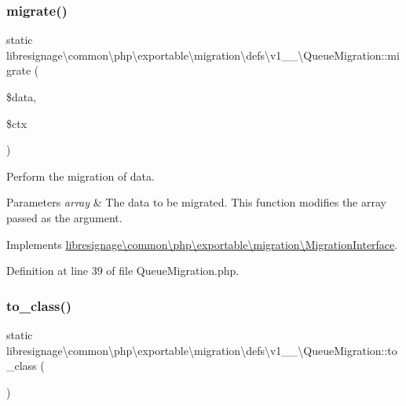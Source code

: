 \subsubsection{\texorpdfstring{migrate()}{migrate()}}
{\footnotesize\ttfamily static libresignage\textbackslash{}common\textbackslash{}php\textbackslash{}exportable\textbackslash{}migration\textbackslash{}defs\textbackslash{}v1\+\_\+\_\textbackslash{}\+Queue\+Migration\+::migrate (\begin{DoxyParamCaption}\item[{array \&}]{\$data,  }\item[{\hyperlink{classlibresignage_1_1common_1_1php_1_1exportable_1_1ExportableDataContext}{Exportable\+Data\+Context}}]{\$ctx }\end{DoxyParamCaption})\hspace{0.3cm}{\ttfamily [static]}}

Perform the migration of data.


\begin{DoxyParams}{Parameters}
{\em array} & The data to be migrated. This function modifies the array passed as the argument. \\
\hline
\end{DoxyParams}


Implements \hyperlink{interfacelibresignage_1_1common_1_1php_1_1exportable_1_1migration_1_1MigrationInterface_a8275bfe14f59f19bb3b33b239fd48c5d}{libresignage\textbackslash{}common\textbackslash{}php\textbackslash{}exportable\textbackslash{}migration\textbackslash{}\+Migration\+Interface}.



Definition at line 39 of file Queue\+Migration.\+php.

\mbox{\label{classlibresignage_1_1common_1_1php_1_1exportable_1_1migration_1_1defs_1_1v1__0__0_1_1QueueMigration_a8c62d7f567538ab48e7bfceb58891063}} 
\subsubsection{\texorpdfstring{to\+\_\+class()}{to\_class()}}
{\footnotesize\ttfamily static libresignage\textbackslash{}common\textbackslash{}php\textbackslash{}exportable\textbackslash{}migration\textbackslash{}defs\textbackslash{}v1\+\_\+\_\textbackslash{}\+Queue\+Migration\+::to\+\_\+class (\begin{DoxyParamCaption}{ }\end{DoxyParamCaption})\hspace{0.3cm}{\ttfamily [static]}}

